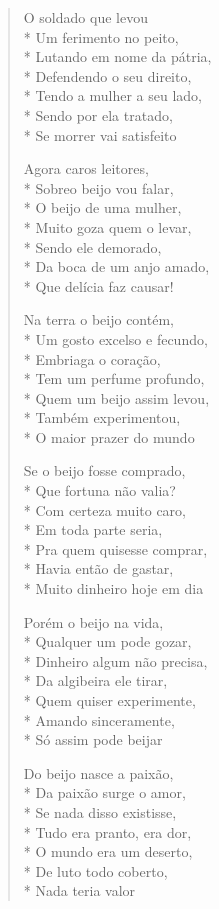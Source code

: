 \begin{verse}
O soldado que levou\\*
Um ferimento no peito,\\*
Lutando em nome da pátria,\\*
Defendendo o seu direito,\\*
Tendo a mulher a seu lado,\\*
Sendo por ela tratado,\\*
Se morrer vai satisfeito

Agora caros leitores,\\*
Sobreo beijo vou falar,\\*
O beijo de uma mulher,\\*
Muito goza quem o levar,\\*
Sendo ele demorado,\\*
Da boca de um anjo amado,\\*
Que delícia faz causar!

Na terra o beijo contém,\\*
Um gosto excelso e fecundo,\\*
Embriaga o coração,\\*
Tem um perfume profundo,\\*
Quem um beijo assim levou,\\*
Também experimentou,\\*
O maior prazer do mundo

Se o beijo fosse comprado,\\*
Que fortuna não valia?\\*
Com certeza muito caro,\\*
Em toda parte seria,\\*
Pra quem quisesse comprar,\\*
Havia então de gastar,\\*
Muito dinheiro hoje em dia

Porém o beijo na vida,\\*
Qualquer um pode gozar,\\*
Dinheiro algum não precisa,\\*
Da algibeira ele tirar,\\*
Quem quiser experimente,\\*
Amando sinceramente,\\*
Só assim pode beijar

Do beijo nasce a paixão,\\*
Da paixão surge o amor,\\*
Se nada disso existisse,\\*
Tudo era pranto, era dor,\\*
O mundo era um deserto,\\*
De luto todo coberto,\\*
Nada teria valor


\end{verse}
